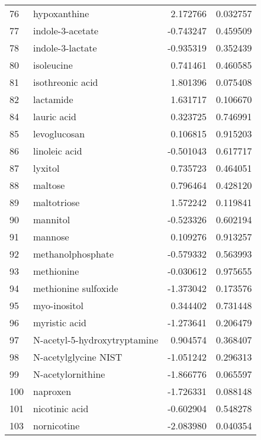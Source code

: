 \begin{tabular}{llrr}
76  &                       hypoxanthine &  2.172766 &  0.032757 \\
77  &                   indole-3-acetate & -0.743247 &  0.459509 \\
78  &                   indole-3-lactate & -0.935319 &  0.352439 \\
80  &                         isoleucine &  0.741461 &  0.460585 \\
81  &                   isothreonic acid &  1.801396 &  0.075408 \\
82  &                          lactamide &  1.631717 &  0.106670 \\
84  &                        lauric acid &  0.323725 &  0.746991 \\
85  &                       levoglucosan &  0.106815 &  0.915203 \\
86  &                      linoleic acid & -0.501043 &  0.617717 \\
87  &                            lyxitol &  0.735723 &  0.464051 \\
88  &                            maltose &  0.796464 &  0.428120 \\
89  &                        maltotriose &  1.572242 &  0.119841 \\
90  &                           mannitol & -0.523326 &  0.602194 \\
91  &                            mannose &  0.109276 &  0.913257 \\
92  &                  methanolphosphate & -0.579332 &  0.563993 \\
93  &                         methionine & -0.030612 &  0.975655 \\
94  &               methionine sulfoxide & -1.373042 &  0.173576 \\
95  &                       myo-inositol &  0.344402 &  0.731448 \\
96  &                      myristic acid & -1.273641 &  0.206479 \\
97  &       N-acetyl-5-hydroxytryptamine &  0.904574 &  0.368407 \\
98  &               N-acetylglycine NIST & -1.051242 &  0.296313 \\
99  &                  N-acetylornithine & -1.866776 &  0.065597 \\
100 &                           naproxen & -1.726331 &  0.088148 \\
101 &                     nicotinic acid & -0.602904 &  0.548278 \\
103 &                        nornicotine & -2.083980 &  0.040354 \\

\end{tabular}
